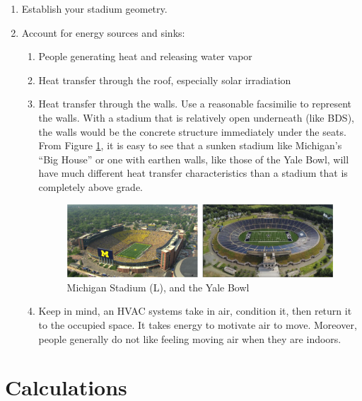 \documentclass[]{tufte-book}
\providecommand{\tightlist}{%
  \setlength{\itemsep}{0pt}\setlength{\parskip}{0pt}}
\begin{document}
\begin{enumerate}
\def\labelenumi{\arabic{enumi}.}
\tightlist
\item
  Establish your stadium geometry.
\item
  Account for energy sources and sinks:

  \begin{enumerate}
  \def\labelenumii{\alph{enumii}.}
  \item
    People generating heat and releasing water vapor
  \item
    Heat transfer through the roof, especially solar irradiation
  \item
    Heat transfer through the walls. Use a reasonable facsimilie to represent the walls. With a stadium that is relatively open underneath (like BDS), the walls would be the concrete structure immediately under the seats. From Figure \ref{fig:bighousebowl}, it is easy to see that a sunken stadium like Michigan's ``Big House'' or one with earthen walls, like those of the Yale Bowl, will have much different heat transfer characteristics than a stadium that is completely above grade.

    \begin{figure}
     \includegraphics[width=23.94in]{figures/bighousebowl} \caption[Michigan Stadium (L), and the Yale Bowl]{Michigan Stadium (L), and the Yale Bowl}\label{fig:bighousebowl}
     \end{figure}
  \item
    Keep in mind, an HVAC systems take in air, condition it, then return it to the occupied space. It takes energy to motivate air to move. Moreover, people generally do not like feeling moving air when they are indoors.
  \end{enumerate}
\end{enumerate}

\hypertarget{calculations}{%
\section{Calculations}\label{calculations}}
\end{document}
